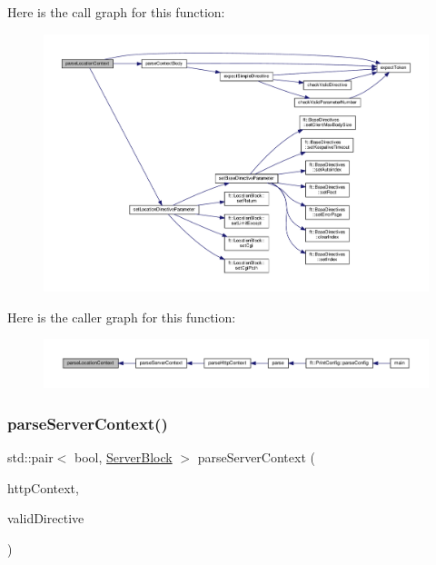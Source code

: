 Here is the call graph for this function\+:
\nopagebreak
\begin{figure}[H]
\begin{center}
\leavevmode
\includegraphics[width=350pt]{classft_1_1_parser_a87f0f31d2bc2e6357d522e70256878ca_cgraph}
\end{center}
\end{figure}
Here is the caller graph for this function\+:
\nopagebreak
\begin{figure}[H]
\begin{center}
\leavevmode
\includegraphics[width=350pt]{classft_1_1_parser_a87f0f31d2bc2e6357d522e70256878ca_icgraph}
\end{center}
\end{figure}
\mbox{\label{classft_1_1_parser_ae53bb700e0344f7af2519a5af3ae4230}} 
\subsubsection{\texorpdfstring{parse\+Server\+Context()}{parseServerContext()}}
{\footnotesize\ttfamily std\+::pair$<$ bool, \hyperlink{classft_1_1_server_block}{Server\+Block} $>$ parse\+Server\+Context (\begin{DoxyParamCaption}\item[{\hyperlink{classft_1_1_http_block}{Http\+Block} \&}]{http\+Context,  }\item[{std\+::pair$<$ bool, \hyperlink{classft_1_1_directive}{Directive} $>$}]{valid\+Directive }\end{DoxyParamCaption})\hspace{0.3cm}{\ttfamily [private]}}



